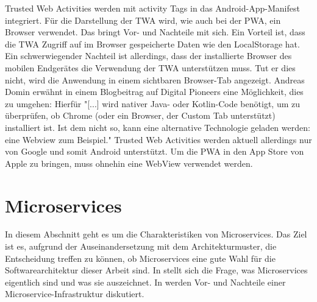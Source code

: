 Trusted Web Activities werden mit activity Tags in das Android-App-Manifest integriert. Für die Darstellung
der TWA wird, wie auch bei der PWA, ein Browser verwendet. Das bringt Vor- und Nachteile mit sich.
Ein Vorteil ist, dass die TWA Zugriff auf im Browser gespeicherte Daten wie den LocalStorage
hat. Ein schwerwiegender Nachteil ist allerdings, dass der installierte Browser des mobilen Endgerätes
die Verwendung der TWA unterstützen muss. Tut er dies nicht, wird die Anwendung in einem sichtbaren
Browser-Tab angezeigt. Andreas Domin erwähnt in einem Blogbeitrag auf Digital Pioneers eine Möglichkeit,
dies zu umgehen: Hierfür "[...] wird nativer Java- oder Kotlin-Code benötigt, um zu überprüfen, ob Chrome
(oder ein Browser, der Custom Tab unterstützt) installiert ist.
Ist dem nicht so, kann eine alternative Technologie geladen werden:
eine Webview zum Beispiel."\cite[2. Abschnitt]{TrustedWebActivitiesT3N}
Trusted Web Activities werden aktuell allerdings nur von Google und somit Android unterstützt. Um die PWA
in den App Store von Apple zu bringen, muss ohnehin eine WebView verwendet werden.

\section{Microservices}
\label{sec:microservices}
In diesem Abschnitt geht es um die Charakteristiken von Microservices. Das Ziel ist es,
aufgrund der Auseinandersetzung mit dem Architekturmuster, die Entscheidung treffen zu können, ob Microservices
eine gute Wahl für die Softwarearchitektur dieser Arbeit sind. In 
stellt sich die Frage, was Microservices eigentlich sind und was sie auszeichnet. In
 werden Vor- und Nachteile einer Microservice-Infrastruktur
diskutiert.

